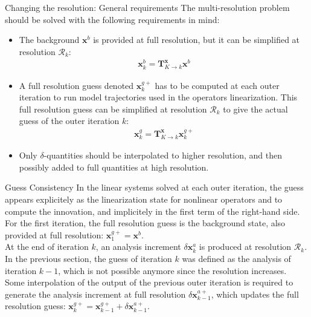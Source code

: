 \documentclass[10pt]{beamer}
\begin{document}
\begin{frame}{Changing the resolution: General requirements}
 The multi-resolution problem should be solved with the following requirements in mind:
\begin{itemize}
\item The background $\mathbf{x}^b$ is provided at full resolution, but it can be simplified at resolution $\mathcal{R}_k$:
\begin{align}
\boxed{\mathbf{x}^b_k = \mathbf{T}^\mathbf{x}_{K \rightarrow k} \mathbf{x}^b}
\end{align}
\item A full resolution guess denoted $\mathbf{x}^{g+}_k$ has to be computed at each outer iteration to run model trajectories used in the operators linearization. This full resolution guess can be simplified at resolution $\mathcal{R}_k$ to give the actual guess of the outer iteration $k$:
\begin{align}
\boxed{\mathbf{x}^g_k = \mathbf{T}^\mathbf{x}_{K \rightarrow k} \mathbf{x}^{g+}_k}
\end{align}
\item Only $\delta$-quantities should be interpolated to higher resolution, and then possibly added to full quantities at high resolution.
\end{itemize}
\end{frame}



\begin{frame}{Guess Consistency}
 In the linear systems solved at each outer iteration, the guess appears explicitely as the linearization state for nonlinear operators and to compute the innovation, and implicitely in the first term of the right-hand side.\\
\vspace{+0.2cm}
For the first iteration, the full resolution guess is the background state, also provided at full resolution: $\mathbf{x}^{g+}_1 = \mathbf{x}^b$.\\
\vspace{+0.2cm}
At the end of iteration $k$, an analysis increment $\delta \mathbf{x}^a_k$ is produced at resolution $\mathcal{R}_k$. In the previous section, the guess of iteration $k$ was defined as the analysis of iteration $k-1$, which is not possible anymore since the resolution increases.\\
\vspace{+0.2cm}
Some interpolation of the output of the previous outer iteration is required to generate the analysis increment at full resolution $\delta \mathbf{x}^{a+}_{k-1}$, which updates the full resolution guess: $\mathbf{x}^{g+}_k = \mathbf{x}^{g+}_{k-1} + \delta \mathbf{x}^{a+}_{k-1}$. 
\end{frame}
\end{document}
